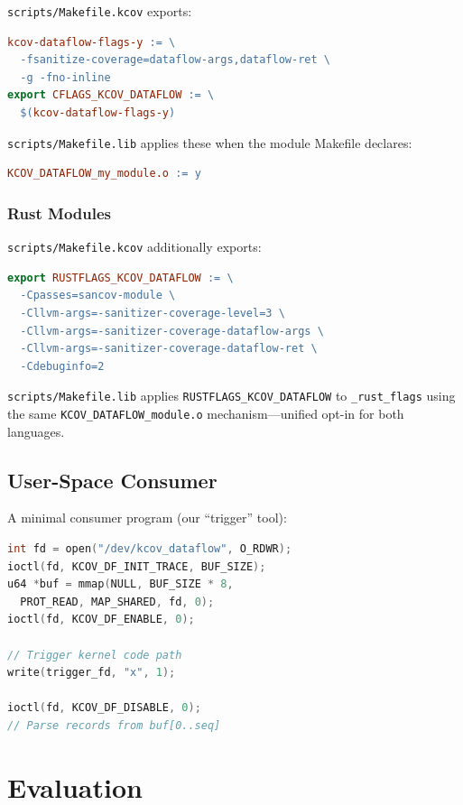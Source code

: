 \documentclass{ndss}
\begin{document}
\texttt{scripts/Makefile.kcov} exports:
\begin{lstlisting}[language=make,numbers=none]
kcov-dataflow-flags-y := \
  -fsanitize-coverage=dataflow-args,dataflow-ret \
  -g -fno-inline
export CFLAGS_KCOV_DATAFLOW := \
  $(kcov-dataflow-flags-y)
\end{lstlisting}

\texttt{scripts/Makefile.lib} applies these when the module Makefile declares:
\begin{lstlisting}[language=make,numbers=none]
KCOV_DATAFLOW_my_module.o := y
\end{lstlisting}

\subsubsection{Rust Modules}

\texttt{scripts/Makefile.kcov} additionally exports:
\begin{lstlisting}[language=make,numbers=none]
export RUSTFLAGS_KCOV_DATAFLOW := \
  -Cpasses=sancov-module \
  -Cllvm-args=-sanitizer-coverage-level=3 \
  -Cllvm-args=-sanitizer-coverage-dataflow-args \
  -Cllvm-args=-sanitizer-coverage-dataflow-ret \
  -Cdebuginfo=2
\end{lstlisting}

\texttt{scripts/Makefile.lib} applies \texttt{RUSTFLAGS\_KCOV\_DATAFLOW} to
\texttt{\_rust\_flags} using the same \texttt{KCOV\_DATAFLOW\_module.o}
mechanism---unified opt-in for both languages.

\subsection{User-Space Consumer}

A minimal consumer program (our ``trigger'' tool):
\begin{lstlisting}[language=C,caption={User-space kcov\_dataflow consumer.}]
int fd = open("/dev/kcov_dataflow", O_RDWR);
ioctl(fd, KCOV_DF_INIT_TRACE, BUF_SIZE);
u64 *buf = mmap(NULL, BUF_SIZE * 8,
  PROT_READ, MAP_SHARED, fd, 0);
ioctl(fd, KCOV_DF_ENABLE, 0);

// Trigger kernel code path
write(trigger_fd, "x", 1);

ioctl(fd, KCOV_DF_DISABLE, 0);
// Parse records from buf[0..seq]
\end{lstlisting}


\section{Evaluation}\label{sec:eval}
\end{document}
